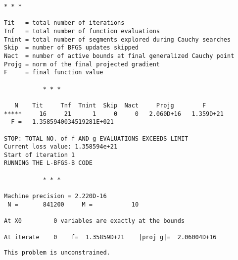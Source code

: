 \documentclass[11pt]{article}
\begin{document}
\begin{Verbatim}[commandchars=\\\{\}]
           * * *

Tit   = total number of iterations
Tnf   = total number of function evaluations
Tnint = total number of segments explored during Cauchy searches
Skip  = number of BFGS updates skipped
Nact  = number of active bounds at final generalized Cauchy point
Projg = norm of the final projected gradient
F     = final function value

           * * *

   N    Tit     Tnf  Tnint  Skip  Nact     Projg        F
*****     16     21      1     0     0   2.060D+16   1.359D+21
  F =   1.3585940034519281E+021

STOP: TOTAL NO. of f AND g EVALUATIONS EXCEEDS LIMIT
Current loss value: 1.358594e+21
Start of iteration 1
RUNNING THE L-BFGS-B CODE

           * * *

Machine precision = 2.220D-16
 N =       841200     M =           10

At X0         0 variables are exactly at the bounds

At iterate    0    f=  1.35859D+21    |proj g|=  2.06004D+16
    \end{Verbatim}

    \begin{Verbatim}[commandchars=\\\{\}]
 This problem is unconstrained.
    \end{Verbatim}
\end{document}
